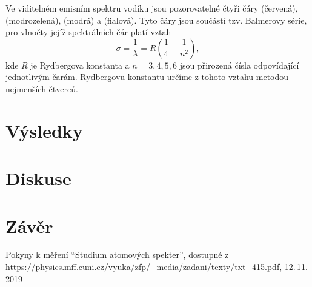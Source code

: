 \documentclass{scirep}
\begin{document}
    Ve viditelném emisním spektru vodíku jsou pozorovatelné čtyři čáry  (červená),  (modrozelená),  (modrá) a  (fialová).
    Tyto čáry jsou součástí tzv. Balmerovy série, pro vlnočty jejíž spektrálních čár platí vztah
    \begin{equation} \label{eq:rydberg}
        \sigma = \frac{1}{\lambda} = R \left( \frac{1}{4} - \frac{1}{n^2} \right),
    \end{equation}
    kde $R$ je Rydbergova konstanta a $n = 3, 4, 5, 6$ jsou přirozená čísla odpovídající jednotlivým čarám.
    Rydbergovu konstantu určíme z tohoto vztahu metodou nejmenších čtverců.



    \section*{Výsledky}



    \section*{Diskuse}



    \section*{Závěr}



    \begin{thebibliography}{}

        Pokyny k měření ``Studium atomových spekter'', dostupné z\\ \url{https://physics.mff.cuni.cz/vyuka/zfp/_media/zadani/texty/txt_415.pdf}, 12.\,11.\,2019

    \end{thebibliography}
\end{document}
